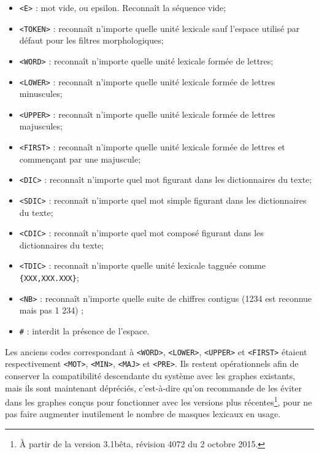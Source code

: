 \index{\verbt{\#}}
\begin{itemize}
  \item \verb+<E>+ : mot vide, ou epsilon. Reconnaît la séquence vide;
  \item \verb+<TOKEN>+ : reconnaît n’importe quelle unité lexicale sauf l'espace
  	  utilisé par défaut pour les filtres morphologiques;
  \item \verb+<WORD>+ : reconnaît n’importe quelle unité lexicale formée de lettres;
  \item \verb+<LOWER>+ : reconnaît n’importe quelle unité lexicale formée de lettres minuscules;
  \item \verb+<UPPER>+ : reconnaît n’importe quelle unité lexicale formée de lettres majuscules;
  \item \verb+<FIRST>+ : reconnaît n’importe quelle unité lexicale formée de lettres et commençant par
  	  une majuscule;
  \item \verb+<DIC>+ : reconnaît n’importe quel mot figurant dans les dictionnaires du texte;
  \item \verb+<SDIC>+ : reconnaît n’importe quel mot simple figurant dans les dictionnaires du
  	  texte;
  \item \verb+<CDIC>+ : reconnaît n’importe quel mot composé figurant dans les dictionnaires du
  	  texte;
  \item \verb+<TDIC>+ : reconnaît n’importe quelle unité lexicale tagguée comme
  	  \verb+{XXX,XXX.XXX}+;
  \item \verb+<NB>+ : reconnaît n’importe quelle suite de chiffres contigus
  	  (1234 est reconnue mais pas 1 234) ;
  \item \verb+#+ : interdit la présence de l'espace.
\end{itemize}

\noindent  Les anciens codes correspondant à \verb+<WORD>+, \verb+<LOWER>+, \verb+<UPPER>+ et \verb+<FIRST>+
 étaient respectivement \verb+<MOT>+, \verb+<MIN>+, \verb+<MAJ>+ et \verb+<PRE>+.
 Ils restent opérationnels afin de conserver la compatibilité descendante
 du système avec les graphes existants, mais ils sont maintenant dépréciés,
 c'est-à-dire qu'on recommande de les éviter dans les graphes conçus pour fonctionner avec les versions plus récentes\footnote{À partir de la version 3.1bêta, révision 4072 du 2 octobre 2015.},
pour ne pas faire augmenter inutilement le nombre de masques lexicaux en usage.

